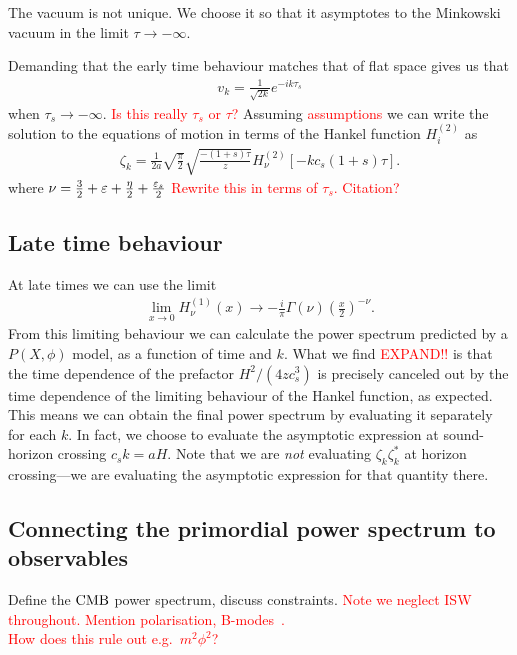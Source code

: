     The vacuum is not unique. We choose it so that it
    asymptotes to the Minkowski vacuum in the limit $\tau\to-\infty$.

    Demanding that the early time behaviour matches that of flat space
    gives us that
    \begin{align}
        v_k = \frac{1}{\sqrt{2k}}e^{-ik\tau_s}
    \end{align}
    when $\tau_s\rightarrow -\infty$.
    \textcolor{red}{Is this really $\tau_s$ or $\tau$?}
    Assuming \textcolor{red}{assumptions} we can write the solution to the equations
    of motion in terms of the Hankel function $H^{(2)}_i$ as~\cite{px_burrage}
    \begin{align}
        \zeta_k = \frac{1}{2a}\sqrt{\frac{\pi}{2}}\sqrt{\frac{-(1+s)\tau}{z}}H^{(2)}_{\nu}\left[-kc_s(1+s)\tau\right].
    \end{align}
    where $\nu = \frac{3}{2}+\varepsilon+\frac{\eta}{2}+\frac{\varepsilon_{s}}{2}$
    \textcolor{red}{Rewrite this in terms of $\tau_s$. Citation?}

    \subsection{Late time behaviour}
    At late times we can use the limit
    \begin{align}
        \lim_{x\rightarrow 0}H^{(1)}_\nu(x)\rightarrow-\frac{i}{\pi}\Gamma(\nu)\left(\frac{x}{2}\right)^{-\nu}.
    \end{align}
    From this limiting behaviour we can calculate the power spectrum predicted by
    a $P(X,\phi)$ model, as a function of time and $k$.
    What we find \textcolor{red}{EXPAND!!} is that the time dependence
    of the prefactor $H^2/(4zc_s^3)$ is precisely canceled out by the time dependence
    of the limiting behaviour of the Hankel function, as expected.
    This means we can obtain the final power spectrum by evaluating
    it separately for each $k$. In fact, we choose to evaluate the asymptotic expression
    at sound-horizon crossing $c_sk=aH$. Note that we are \textit{not} evaluating
    $\zeta_k\zeta^*_k$ at horizon crossing---we are evaluating the asymptotic expression
    for that quantity there.


    \subsection{Connecting the primordial power spectrum to observables}
    Define the $\text{CMB}$ power spectrum, discuss constraints.
    \textcolor{red}{Note we neglect ISW throughout. Mention polarisation, B-modes~\cite{Baumann_bmodes_2014}.\\
    How does this rule out e.g.\ $m^2\phi^2$?}


